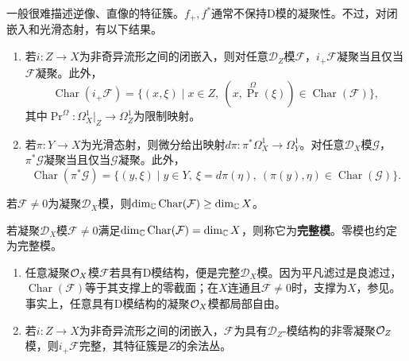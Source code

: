 一般很难描述逆像、直像的特征簇。$f_+,f^*$通常不保持D模的凝聚性。不过，对闭嵌入和光滑态射，有以下结果。
\begin{enumerate}[label=(\roman*)]
\item 若$i:Z\to X$为非奇异流形之间的闭嵌入，则对任意$\mathcal D_Z$模$\mathcal F$，$i_+\mathcal F$凝聚当且仅当$\mathcal F$凝聚。此外，
\[\operatorname{Char}(i_+\mathcal F)=\{(x,\xi)\mid x\in Z,\ (x,\operatorname{Pr}^{\Omega}(\xi))\in\operatorname{Char}(\mathcal F)\},\]
其中$\operatorname{Pr}^{\Omega}:\Omega_X^1|_Z\to\Omega_Z^1$为限制映射。
\item 若$\pi:Y\to X$为光滑态射，则微分给出映射$d\pi:\pi^*\Omega_X^1\to\Omega_Y^1$。对任意$\mathcal D_X$模$\mathcal G$，$\pi^*\mathcal G$凝聚当且仅当$\mathcal G$凝聚。此外，
\[\operatorname{Char}(\pi^*\mathcal G)=\{(y,\xi)\mid y\in Y,\ \xi=d\pi(\eta),\ (\pi(y),\eta)\in\operatorname{Char}(\mathcal G)\}.\]
\end{enumerate}
\begin{theorem}\label{L14S2O5}
若$\mathcal F\ne0$为凝聚$\mathcal D_X$模，则$\dim_{\mathbb{C}}\operatorname{Char}(\mathcal F)\ge\dim_{\mathbb{C}}X$。
\end{theorem}
\begin{definition}\label{L14S2O6}
若凝聚$\mathcal D_X$模$\mathcal F\ne0$满足$\dim_{\mathbb{C}}\operatorname{Char}(\mathcal F)=\dim_{\mathbb{C}}X$，则称它为\textbf{完整模}。零模也约定为完整模。
\end{definition}
\begin{example}\label{L14S2O7}
\begin{enumerate}[label=(\arabic*)]
\item 任意凝聚$\mathcal O_X$模$\mathcal F$若具有D模结构，便是完整$\mathcal D_X$模。因为平凡滤过是良滤过，$\operatorname{Char}(\mathcal F)$等于其支撑上的零截面；在$X$连通且$\mathcal F\ne0$时，支撑为$X$，参见。事实上，任意具有D模结构的凝聚$\mathcal O_X$模都局部自由。
\item 若$i:Z\to X$为非奇异流形之间的闭嵌入，$\mathcal F$为具有$\mathcal D_Z$-模结构的非零凝聚$\mathcal O_Z$模，则$i_+\mathcal F$完整，其特征簇是$Z$的余法丛。
\end{enumerate}
\end{example}
